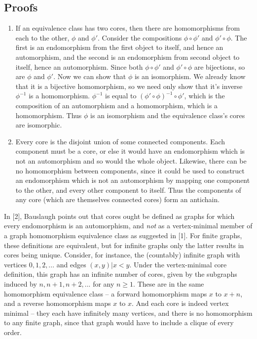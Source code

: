 \documentclass[12pt]{article}
\newcommand{\compose}{\circ}
\begin{document}
\subsection{Proofs}
  \begin{enumerate}
  \item If an equivalence class has two cores, then there are
    homomorphisms from each to the other, $\phi$ and $\phi'$. Consider
    the compositions $\phi \compose \phi'$ and $\phi' \compose
    \phi$. The first is an endomorphism from the first object to
    itself, and hence an automorphism, and the second is an
    endomorphism from second object to itself, hence an
    automorphism. Since both $\phi \compose \phi'$ and $\phi' \compose
    \phi$ are bijections, so are $\phi$ and $\phi'$. Now we can show
    that $\phi$ is an isomorphism. We already know that it is a
    bijective homomorphism, so we need only show that it's inverse
    $\phi^{-1}$ is a homomorphism.  $\phi^{-1}$ is equal to $(\phi'
    \compose \phi)^{-1} \compose \phi'$, which is the composition of
    an automorphism and a homomorphism, which is a homomorphism. Thus
    $\phi$ is an isomorphism and the equivalence class's cores are
    isomorphic.
  \item Every core is the disjoint union of some connected
    components. Each component must be a core, or else it would have
    an endomorphism which is not an automorphism and so would the
    whole object. Likewise, there can be no homomorphism between
    components, since it could be used to construct an endomorphism
    which is not an automorphism by mapping one component to the
    other, and every other component to itself. Thus the components of
    any core (which are themselves connected cores) form an antichain.
  \end{enumerate}

  In [2], Bauslaugh points out that cores ought be defined as graphs
  for which every endomorphism is an automorphism, and \emph{not} as a
  vertex-minimal member of a graph homomorphism equivalence class as
  suggested in [1]. For finite graphs, these definitions are
  equivalent, but for infinite graphs only the latter results in cores
  being unique. Consider, for instance, the (countably) infinite graph
  with vertices ${0, 1, 2, ...}$ and edges ${(x, y) | x < y}$. Under
  the vertex-minimal core definition, this graph has an infinite
  number of cores, given by the subgraphs induced by ${n, n+1, n+2,
    ...}$ for any $n \geq 1$. These are in the same homomorphism
  equivalence class -- a forward homomorphism maps $x$ to $x + n$, and
  a reverse homomorphism maps $x$ to $x$. And each core is indeed
  vertex minimal -- they each have infinitely many vertices, and there
  is no homomorphism to any finite graph, since that graph would have
  to include a clique of every order.
\end{document}
